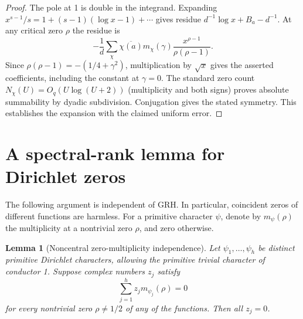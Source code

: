 \documentclass[11pt]{article}
\newtheorem{lemma}[theorem]{Lemma}
\theoremstyle{remark}\newtheorem{remark}[theorem]{Remark}
\begin{document}
\begin{proof}
The pole at 1 is double in the integrand. Expanding $x^{s-1}/s=1+(s-1)(\log x-1)+\cdots$ gives residue $d^{-1}\log x+B_a-d^{-1}$. At any critical zero $\rho$ the residue is
\[
 -\frac{1}{d}\sum_\chi\overline{\chi(a)}m_\chi(\gamma)
              \frac{x^{\rho-1}}{\rho(\rho-1)}.
\]
Since $\rho(\rho-1)=-(1/4+\gamma^2)$, multiplication by $\sqrt x$ gives the asserted coefficients, including the constant at $\gamma=0$. The standard zero count $N_\chi(U)=O_q(U\log(U+2))$ (multiplicity and both signs) proves absolute summability by dyadic subdivision. Conjugation gives the stated symmetry. This establishes the expansion with the claimed uniform error.
\end{proof}

\section{A spectral-rank lemma for Dirichlet zeros}
The following argument is independent of GRH. In particular, coincident zeros of different functions are harmless. For a primitive character $\psi$, denote by $m_\psi(\rho)$ the multiplicity at a nontrivial zero $\rho$, and zero otherwise.
\begin{lemma}[Noncentral zero-multiplicity independence]\label{lem:rank}
Let $\psi_1,\ldots,\psi_h$ be distinct primitive Dirichlet characters, allowing the primitive trivial character of conductor 1. Suppose complex numbers $z_j$ satisfy
\[
 \sum_{j=1}^h z_j m_{\psi_j}(\rho)=0
\]
for every nontrivial zero $\rho\ne1/2$ of any of the functions. Then all $z_j=0$.
\end{lemma}
\end{document}
